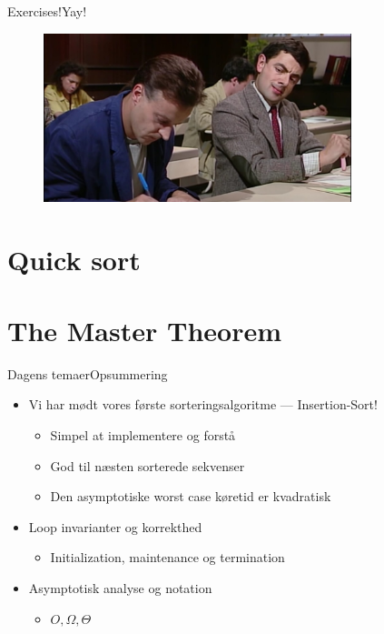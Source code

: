 \documentclass[aspectratio=1610]{beamer}
\begin{document}
\begin{frame}{Exercises!}{Yay!}
    
    \begin{figure}[h]
        \centering
        \includegraphics[width=0.8\textwidth]{exercises}
    \end{figure}
    
\end{frame}


\section{Quick sort}
\section{The Master Theorem}

\begin{frame}{Dagens temaer}{Opsummering}
    \begin{itemize}
        \item Vi har mødt vores første sorteringsalgoritme --- Insertion-Sort!
            \begin{itemize}
                \item Simpel at implementere og forstå
                \item God til næsten sorterede sekvenser
                \item Den asymptotiske worst case køretid er kvadratisk
            \end{itemize}
        \item Loop invarianter og korrekthed
            \begin{itemize}
                \item Initialization, maintenance og termination
            \end{itemize}
        \item Asymptotisk analyse og notation
            \begin{itemize}
                \item $O, \Omega, \Theta$
            \end{itemize}
    \end{itemize}
\end{frame}
\end{document}
